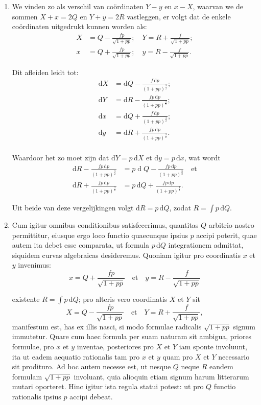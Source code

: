\documentclass[10pt,a4paper]{article}
\newcommand{\switchenum}{\setcounter{enumi}{\arabic{enumi}-1}\switchcolumn}
\def\D{\mathrm{d}}
\begin{document}
\begin{paracol}{2}
\begin{enumerate}[topsep=1px]
		\switchenum
		\item We vinden zo als verschil van coördinaten $Y-y$ en $x-X$, waarvan we de sommen $X+x=2Q$ en $Y+y=2R$ vastleggen, er volgt dat de enkele coördinaten uitgedrukt kunnen worden als:
		\begin{align*}
			X &= Q - \frac{fp}{\sqrt{1+pp}}; \quad Y = R + \frac{f}{\sqrt{1+pp}};\\
			x &= Q+\frac{fp}{\sqrt{1+pp}}; \quad y= R- \frac{f}{\sqrt{1+pp}}.
		\end{align*}
		\par Dit afleiden leidt tot:
		\begin{align*}
			\D X &= \D Q - \frac{f\,\D p}{(1+pp)^\frac{3}{2}};\\
			\D Y &= \D R-\frac{fp\,\D p}{(1+pp)^\frac{3}{2}};\\
			\D x &= \D Q + \frac{f\,\D p}{(1+pp)^\frac{3}{2}};\\
			\D y &= \D R + \frac{fp\,\D p}{(1+pp)^\frac{3}{2}}.\\
		\end{align*}
		\par Waardoor het zo moet zijn dat $\D Y=p\,\D X$ et $\D y=p\,\D x$, wat wordt
		\begin{align*}
			\D R - \frac{fp\,\D p}{(1+pp)^\frac{3}{2}} &= p\operatorname{d}Q - \frac{fp\, \D p}{(1+pp)^\frac{3}{2}} \quad \text{et}\\
			\D R + \frac{fp\,\D p}{(1+pp)^\frac{3}{2}} &= p\,\D Q + \frac{fp\,\D p}{(1+pp)^\frac{3}{2}}.
		\end{align*}
		\par Uit beide van deze vergelijkingen volgt $\D R = p \, \D Q$, zodat $R= \int p \,\D Q$.
		\switchcolumn*
		
		\item Cum igitur omnibus conditionibus satisfecerimus, quantitas $Q$ arbitrio nostro permittitur, eiusque ergo loco functio quaecunque ipsius $p$ accipi poterit, quae autem ita debet esse comparata, ut formula $p\,\D Q$ integrationem admittat, siquidem curvas algebraicas desideremus. Quoniam igitur pro coordinatis $x$ et $y$ invenimus:
		\[
			x = Q + \frac{fp}{\sqrt{1+pp}} \quad\text{et}\quad y = R - \frac{f}{\sqrt{1+pp}}
		\]
		\par existente $R = \int p \,\D Q$; pro alteris vero coordinatis $X$ et $Y$ sit
		\[
			X = Q- \frac{fp}{\sqrt{1+pp}} \quad \text{et} \quad Y = R + \frac{f}{\sqrt{1+pp}},
		\]
		manifestum est, has ex illis nasci, si modo formulae radicalis $\sqrt{1+pp}$ signum immutetur. Quare cum haec formula per suam naturam sit ambigua, priores formulae, pro $x$ et $y$ inventae, posteriores pro $X$ et $Y$ iam sponte involuunt, ita ut eadem aequatio rationalis tam pro $x$ et $y$ quam pro $X$ et $Y$ necessario sit prodituro. Ad hoc autem necesse est, ut nesque $Q$ neque $R$ eandem formulam $\sqrt{1+pp}$ involuant, quia alioquin etiam signum harum litterarum mutari oporteret. Hinc igitur ista regula statui potest: ut pro $Q$ functio rationalis ipsius $p$ accipi debeat.
		

\end{enumerate}
\end{paracol}
\end{document}
